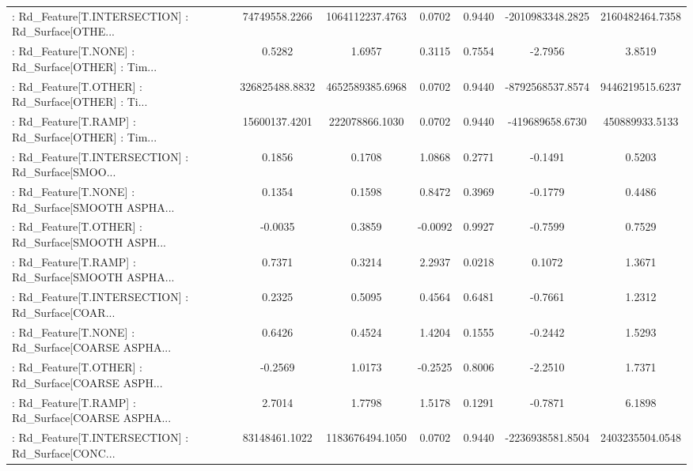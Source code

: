 \begin{longtable}{p{4cm}cccccc}
 : Rd\_Feature[T.INTERSECTION] : Rd\_Surface[OTHE... &     74749558.2266 &   1064112237.4763 &  0.0702 &       0.9440 &   -2010983348.2825 &   2160482464.7358 \\
 : Rd\_Feature[T.NONE] : Rd\_Surface[OTHER] : Tim... &            0.5282 &            1.6957 &  0.3115 &       0.7554 &            -2.7956 &            3.8519 \\
 : Rd\_Feature[T.OTHER] : Rd\_Surface[OTHER] : Ti... &    326825488.8832 &   4652589385.6968 &  0.0702 &       0.9440 &   -8792568537.8574 &   9446219515.6237 \\
 : Rd\_Feature[T.RAMP] : Rd\_Surface[OTHER] : Tim... &     15600137.4201 &    222078866.1030 &  0.0702 &       0.9440 &    -419689658.6730 &    450889933.5133 \\
 : Rd\_Feature[T.INTERSECTION] : Rd\_Surface[SMOO... &            0.1856 &            0.1708 &  1.0868 &       0.2771 &            -0.1491 &            0.5203 \\
 : Rd\_Feature[T.NONE] : Rd\_Surface[SMOOTH ASPHA... &            0.1354 &            0.1598 &  0.8472 &       0.3969 &            -0.1779 &            0.4486 \\
 : Rd\_Feature[T.OTHER] : Rd\_Surface[SMOOTH ASPH... &           -0.0035 &            0.3859 & -0.0092 &       0.9927 &            -0.7599 &            0.7529 \\
 : Rd\_Feature[T.RAMP] : Rd\_Surface[SMOOTH ASPHA... &            0.7371 &            0.3214 &  2.2937 &       0.0218 &             0.1072 &            1.3671 \\
 : Rd\_Feature[T.INTERSECTION] : Rd\_Surface[COAR... &            0.2325 &            0.5095 &  0.4564 &       0.6481 &            -0.7661 &            1.2312 \\
 : Rd\_Feature[T.NONE] : Rd\_Surface[COARSE ASPHA... &            0.6426 &            0.4524 &  1.4204 &       0.1555 &            -0.2442 &            1.5293 \\
 : Rd\_Feature[T.OTHER] : Rd\_Surface[COARSE ASPH... &           -0.2569 &            1.0173 & -0.2525 &       0.8006 &            -2.2510 &            1.7371 \\
 : Rd\_Feature[T.RAMP] : Rd\_Surface[COARSE ASPHA... &            2.7014 &            1.7798 &  1.5178 &       0.1291 &            -0.7871 &            6.1898 \\
 : Rd\_Feature[T.INTERSECTION] : Rd\_Surface[CONC... &     83148461.1022 &   1183676494.1050 &  0.0702 &       0.9440 &   -2236938581.8504 &   2403235504.0548 \\

\end{longtable}
